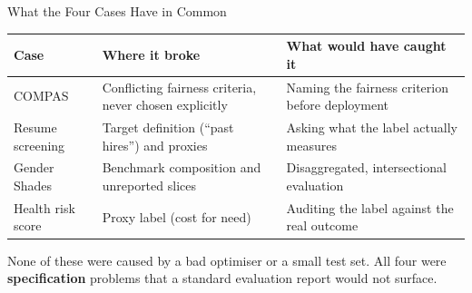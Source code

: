 
\begin{frame}{What the Four Cases Have in Common}

    \centering
    \small
    \begin{tabular}{p{2.6cm} p{4.4cm} p{4.6cm}}
        \toprule
        \textbf{Case} & \textbf{Where it broke} & \textbf{What would have caught it} \\
        \midrule
        COMPAS & Conflicting fairness criteria, never chosen explicitly
               & Naming the fairness criterion before deployment \\
        \addlinespace
        Resume screening & Target definition (``past hires'') and proxies
               & Asking what the label actually measures \\
        \addlinespace
        Gender Shades & Benchmark composition and unreported slices
               & Disaggregated, intersectional evaluation \\
        \addlinespace
        Health risk score & Proxy label (cost for need)
               & Auditing the label against the real outcome \\
        \bottomrule
    \end{tabular}

    \vspace{1.2em}

    \begin{block}{}
        \centering
        None of these were caused by a bad optimiser or a small test set. All four were
        \textbf{specification} problems that a standard evaluation report would not surface.
    \end{block}
\end{frame}
